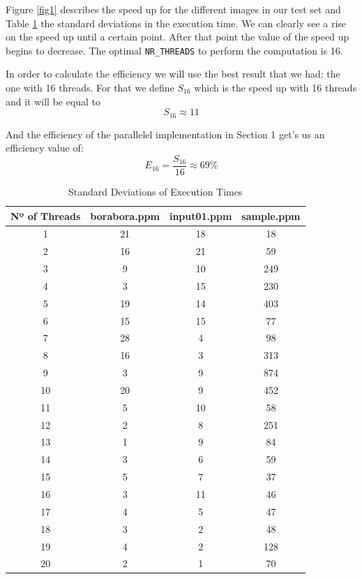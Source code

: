 \documentclass[sigconf]{acmart}
\begin{document}
Figure \ref{fig1} describes the speed up for the different images in our test set and Table \ref{table:standard_deviations} the standard deviations in the execution time. We can clearly see a rise on the speed up until a certain point. After that point the value of the speed up begins to decrease. The optimal \texttt{NR\_THREADS} to perform the computation is 16.

In order to calculate the efficiency we will use the best result that we had: the one with 16 threads. For that we define $S_{16}$ which is the speed up with 16 threads and it will be equal to $$S_{16} \approx 11$$

And the efficiency of the parallelel implementation in Section 1 get's us an efficiency value of: $$E_{16} = \frac{S_{16}}{16} \approx 69\%$$

\begin{table}[h!]
\centering
\begin{tabular}{cccc}
\toprule
\textbf{Nº of Threads} & \textbf{borabora.ppm} & \textbf{input01.ppm} & \textbf{sample.ppm} \\
\midrule
1  & 21 & 18 & 18  \\
2  & 16 & 21 & 59  \\
3  & 9  & 10 & 249 \\
4  & 3  & 15 & 230 \\
5  & 19 & 14 & 403 \\
6  & 15 & 15 & 77  \\
7  & 28 & 4  & 98  \\
8  & 16 & 3  & 313 \\
9  & 3  & 9  & 874 \\
10 & 20 & 9  & 452 \\
11 & 5  & 10 & 58  \\
12 & 2  & 8  & 251 \\
13 & 1  & 9  & 84  \\
14 & 3  & 6  & 59  \\
15 & 5  & 7  & 37  \\
16 & 3  & 11 & 46  \\
17 & 4  & 5  & 47  \\
18 & 3  & 2  & 48  \\
19 & 4  & 2  & 128 \\
20 & 2  & 1  & 70  \\
\bottomrule
\end{tabular}
\caption{Standard Deviations of Execution Times}
\label{table:standard_deviations}
\end{table}
\end{document}
